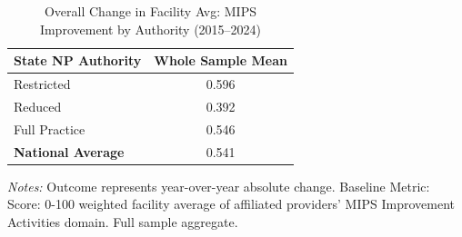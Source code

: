 \begin{table}[htbp]
    \centering
    \caption{Overall Change in Facility Avg: MIPS Improvement by Authority (2015--2024)}
    \label{tab:d_fac_mips_ia_score_full}
    \vspace{0.2cm}
    \begin{tabular}{lc}
        \toprule
        \textbf{State NP Authority} & \textbf{Whole Sample Mean} \\
        \midrule
        Restricted & 0.596 \\
        Reduced & 0.392 \\
        Full Practice & 0.546 \\
        \midrule
        \textbf{National Average} & 0.541 \\
        \bottomrule
    \end{tabular}
    \vspace{0.1cm}
    \begin{minipage}{0.6\textwidth}
        \footnotesize \textit{Notes:} Outcome represents year-over-year absolute change. Baseline Metric: Score: 0-100 weighted facility average of affiliated providers' MIPS Improvement Activities domain. Full sample aggregate.
    \end{minipage}
\end{table}
